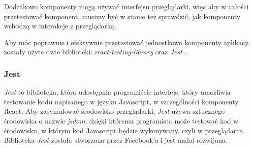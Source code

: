 Dodatkowo komponenty mogą używać interfejsu przeglądarki, więc aby w całości przetestować komponent, musimy być w stanie też sprawdzić, jak komponenty wchodzą w interakcje z przeglądarką.

Aby móc poprawnie i efektywnie przetestować jednostkowo komponenty aplikacji zostały użyte dwie biblioteki: \emph{react-testing-library} \cite{ref_rtl_doc} oraz \emph{Jest} \cite{ref_jest_doc}.

\subsubsection{Jest} \emph{Jest} to biblioteka, która udostępnia programiście interfejs, który umożliwia testowanie kodu napisanego w języku Javascript, w szczególności komponenty React. Aby zasymulować środowisko przeglądarki,
\emph{Jest} używa sztucznego środowiska o nazwie \emph{jsdom}, dzięki któremu programista może testować kod w środowisku, w którym kod Javascript będzie wykonywany, czyli w przeglądarce. Biblioteka \emph{Jest} została stworzona przez Facebook'a i jest nadal rozwijana.

